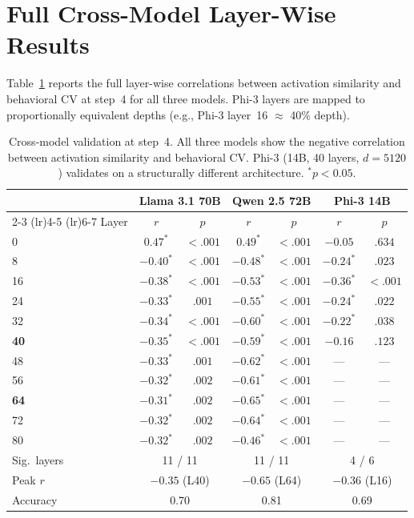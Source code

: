 \documentclass{article}
\begin{document}
\section{Full Cross-Model Layer-Wise Results}
\label{app:crossmodel}

Table~\ref{tab:crossmodel_full} reports the full layer-wise correlations between activation similarity and behavioral CV at step~4 for all three models. Phi-3 layers are mapped to proportionally equivalent depths (e.g., Phi-3 layer~16 $\approx$ 40\% depth).

\begin{table}[ht]
\caption{Cross-model validation at step~4. All three models show the negative correlation between activation similarity and behavioral CV. Phi-3 (14B, 40 layers, $d{=}5120$) validates on a structurally different architecture. $^*p < 0.05$.}
\label{tab:crossmodel_full}
\centering
\small
\begin{tabular}{lcccccc}
\toprule
 & \multicolumn{2}{c}{Llama 3.1 70B} & \multicolumn{2}{c}{Qwen 2.5 72B} & \multicolumn{2}{c}{Phi-3 14B} \\
\cmidrule(lr){2-3} \cmidrule(lr){4-5} \cmidrule(lr){6-7}
Layer & $r$ & $p$ & $r$ & $p$ & $r$ & $p$ \\
\midrule
0  & $0.47^*$ & $< .001$ & $0.49^*$ & $< .001$ & $-0.05$ & $.634$ \\
8  & $-0.40^*$ & $< .001$ & $-0.48^*$ & $< .001$ & $-0.24^*$ & $.023$ \\
16 & $-0.38^*$ & $< .001$ & $-0.53^*$ & $< .001$ & $\mathbf{-0.36^*}$ & $\mathbf{< .001}$ \\
24 & $-0.33^*$ & $.001$ & $-0.55^*$ & $< .001$ & $-0.24^*$ & $.022$ \\
32 & $-0.34^*$ & $< .001$ & $-0.60^*$ & $< .001$ & $-0.22^*$ & $.038$ \\
\textbf{40} & $\mathbf{-0.35^*}$ & $\mathbf{< .001}$ & $-0.59^*$ & $< .001$ & $-0.16$ & $.123$ \\
48 & $-0.33^*$ & $.001$ & $-0.62^*$ & $< .001$ & --- & --- \\
56 & $-0.32^*$ & $.002$ & $-0.61^*$ & $< .001$ & --- & --- \\
\textbf{64} & $-0.31^*$ & $.002$ & $\mathbf{-0.65^*}$ & $\mathbf{< .001}$ & --- & --- \\
72 & $-0.32^*$ & $.002$ & $-0.64^*$ & $< .001$ & --- & --- \\
80 & $-0.32^*$ & $.002$ & $-0.46^*$ & $< .001$ & --- & --- \\
\midrule
Sig.\ layers & \multicolumn{2}{c}{11 / 11} & \multicolumn{2}{c}{11 / 11} & \multicolumn{2}{c}{4 / 6} \\
Peak $r$ & \multicolumn{2}{c}{$-0.35$ (L40)} & \multicolumn{2}{c}{$-0.65$ (L64)} & \multicolumn{2}{c}{$-0.36$ (L16)} \\
Accuracy & \multicolumn{2}{c}{0.70} & \multicolumn{2}{c}{0.81} & \multicolumn{2}{c}{0.69} \\
\bottomrule
\end{tabular}
\end{table}
\end{document}
